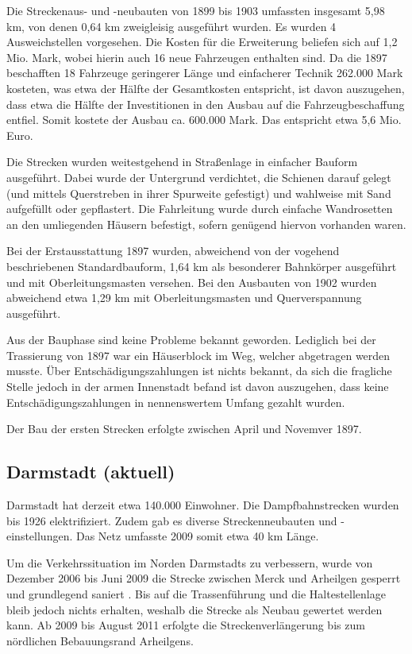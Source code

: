 Die Streckenaus- und -neubauten von 1899 bis 1903 umfassten insgesamt 5,98 km,
von denen 0,64 km zweigleisig ausgeführt wurden. Es wurden 4 Ausweichstellen
vorgesehen. Die Kosten für die Erweiterung beliefen sich auf 1,2 Mio. Mark,
wobei hierin auch 16 neue Fahrzeugen enthalten sind. Da die 1897 beschafften 18
Fahrzeuge geringerer Länge und einfacherer Technik 262.000 Mark kosteten, was
etwa der Hälfte der Gesamtkosten entspricht, ist davon auszugehen, dass etwa die
Hälfte der Investitionen in den Ausbau auf die Fahrzeugbeschaffung
entfiel. Somit kostete der Ausbau ca. 600.000 Mark. Das entspricht etwa 5,6 Mio.
Euro.

Die Strecken wurden weitestgehend in Straßenlage in einfacher Bauform
ausgeführt. Dabei wurde der Untergrund verdichtet, die Schienen darauf gelegt
(und mittels Querstreben in ihrer Spurweite gefestigt) und wahlweise mit Sand
aufgefüllt oder gepflastert. Die Fahrleitung wurde durch einfache Wandrosetten
an den umliegenden Häusern befestigt, sofern genügend hiervon vorhanden waren.

Bei der Erstausstattung 1897 wurden, abweichend von der vogehend beschriebenen
Standardbauform, 1,64 km als besonderer Bahnkörper ausgeführt und mit
Oberleitungsmasten versehen.  Bei den Ausbauten von 1902 wurden abweichend etwa
1,29 km mit Oberleitungsmasten und Querverspannung ausgeführt.

Aus der Bauphase sind keine Probleme bekannt geworden. Lediglich bei der
Trassierung von 1897 war ein Häuserblock im Weg, welcher abgetragen werden
musste. Über Entschädigungszahlungen ist nichts bekannt, da sich die fragliche
Stelle jedoch in der armen Innenstadt befand ist davon auszugehen, dass keine
Entschädigungszahlungen in nennenswertem Umfang gezahlt wurden.

Der Bau der ersten Strecken erfolgte zwischen April und Novemver 1897.

\subsection*{Darmstadt (aktuell)}

Darmstadt hat derzeit etwa 140.000 Einwohner. Die Dampfbahnstrecken wurden bis
1926 elektrifiziert. Zudem gab es diverse Streckenneubauten und
-einstellungen. Das Netz umfasste 2009 somit etwa 40 km Länge.

Um die Verkehrssituation im Norden Darmstadts zu verbessern, wurde von Dezember
2006 bis Juni 2009 die Strecke zwischen Merck und Arheilgen gesperrt und
grundlegend saniert \cite{eoDaAr1}.  Bis auf die Trassenführung und die
Haltestellenlage bleib jedoch nichts erhalten, weshalb die Strecke als Neubau
gewertet werden kann. Ab 2009 bis August 2011 erfolgte die Streckenverlängerung
bis zum nördlichen Bebauungsrand Arheilgens. \cite{eoDaAr2} \cite{eoDaAr3}


